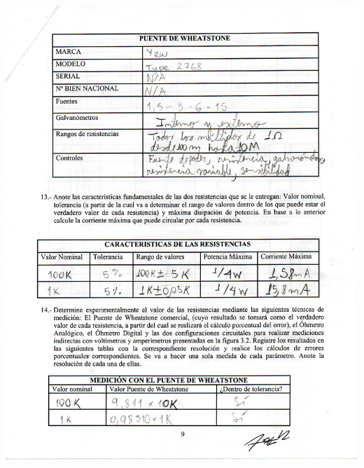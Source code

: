 \documentclass[12pt]{article}
\begin{document}
	\begin{center}
		\includegraphics[width=16cm,height=20cm]{Img/datos_lab_0006}
	\end{center}
\end{document}
